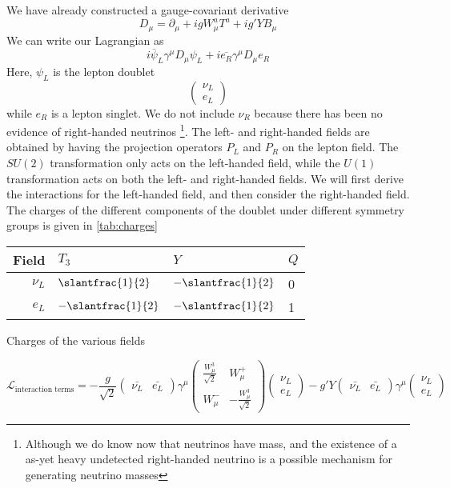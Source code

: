 We have already constructed a gauge-covariant derivative 
$$D_\mu = \partial_\mu + igW_\mu^a T^a + ig'YB_\mu$$
We can write our Lagrangian as
$$i\overline{\psi}_L\gamma^\mu D_\mu\psi_L + i\overline{e_R}\gamma^\mu D_\mu e_R$$
Here, $\psi_L$ is the lepton doublet
$$\begin{pmatrix}\nu_L\\e_L\end{pmatrix}$$
while $e_R$ is a lepton singlet. We do not include $\nu_R$ because there has been no evidence of right-handed neutrinos \footnote{Although we do know now that neutrinos have mass, and the existence of a as-yet heavy undetected right-handed neutrino is a possible mechanism for generating neutrino masses}. The left- and right-handed fields are obtained by having the projection operators $P_L$ and $P_R$ on the lepton field. The $SU(2)$ transformation only acts on the left-handed field, while the $U(1)$ transformation acts on both the left- and right-handed fields. We will first derive the interactions for the left-handed field, and then consider the right-handed field. The charges of the different components of the doublet under different symmetry groups is given in \autoref{tab:charges}
\begin{margintable}
  \centering
  \begin{tabular}{rlll}
    Field & $T_3$ & $Y$ & $Q$ \\
  \hline
  $\nu_L$ & $\slantfrac{1}{2}$ & $-\slantfrac{1}{2}$ & 0\\
  $e_L$ & $-\slantfrac{1}{2}$ & $-\slantfrac{1}{2}$ & 1\\
  \end{tabular}
  \caption{Charges of the various fields}
  \label{tab:charges}
\end{margintable}
\begin{equation}
  \mathcal{L}_\text{interaction terms} = -\frac{g}{\sqrt{2}}
  \begin{pmatrix}
    \bar{\nu_L} & \bar{e_L}
  \end{pmatrix}
  \gamma^\mu
  \begin{pmatrix}
    \frac{W_\mu^3}{\sqrt{2}} & W_\mu^+\\
    W_\mu^- & -\frac{W_\mu^3}{\sqrt{2}}
  \end{pmatrix}
  \begin{pmatrix}
    \nu_L \\ e_L
  \end{pmatrix}
  -g'Y
  \begin{pmatrix}
    \bar{\nu_L} & \bar{e_L}
  \end{pmatrix}
  \gamma^\mu
  \begin{pmatrix}
    \nu_L \\ e_L
  \end{pmatrix}
\end{equation}
